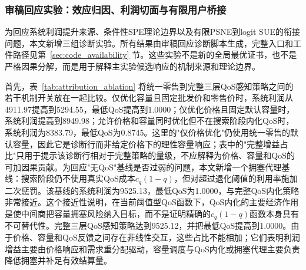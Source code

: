 \documentclass[UTF8,11pt]{ctexart}
\begin{document}
\subsubsection{审稿回应实验：效应归因、利润切面与有限用户桥接}
\label{sec:reviewer_response_diagnostics}

为回应系统利润提升来源、条件性SPE理论边界以及有限PSNE到logit SUE的衔接问题，本文新增三组诊断实验。所有结果由审稿回应诊断脚本生成，完整入口和工件路径见第~\ref{sec:code_availability} 节。这些实验不是新的全局最优证书，也不是严格因果分解，而是用于解释主实验候选响应的机制来源和理论边界。

首先，表~\ref{tab:attribution_ablation} 将统一零售到完整三层QoS感知策略之间的若干机制开关放在一起比较。仅优化容量且固定批发价和零售价时，系统利润从4911.97提高到5294.55，最低QoS提高到1.0000；仅优化价格且固定默认容量时，系统利润提高到8949.98；允许价格和容量同时优化但不在搜索阶段内化QoS时，系统利润为8383.79，最低QoS为0.8745。这里的"仅价格优化"仍使用统一零售的默认容量，因此它是诊断行而非给定价格下的理性容量响应；表中的"完整增益占比"只用于提示该诊断行相对于完整策略的量级，不应解释为价格、容量和QoS的可加因果贡献。为回应"无QoS"基线是否过弱的问题，本文新增一个拥塞代理基线：搜索阶段仍不使用真实QoS成本$c_q(1-q)$，但对超过退化阈值的利用率施加二次惩罚。该基线的系统利润为9525.13，最低QoS为1.0000，与完整QoS内化策略非常接近。这个接近性说明，在当前阈值型QoS函数下，QoS内化的主要经济作用是使中间商把容量拥塞风险纳入目标，而不是证明精确的$c_q(1-q)$函数本身具有不可替代性。完整三层QoS感知策略达到9525.12，并把最低QoS提高到1.0000。由于价格、容量和QoS反馈之间存在非线性交互，这些占比不能相加；它们表明利润增益主要由价格响应和需求重分配驱动，容量调度与QoS内化或拥塞代理主要负责降低拥塞并补足有效结算量。

\begin{table}[H]
\centering
\caption{系统利润提升的诊断性消融。完整增益占比不是可加因果分解。}
\label{tab:attribution_ablation}
\small
{}
\end{table}
\end{document}

